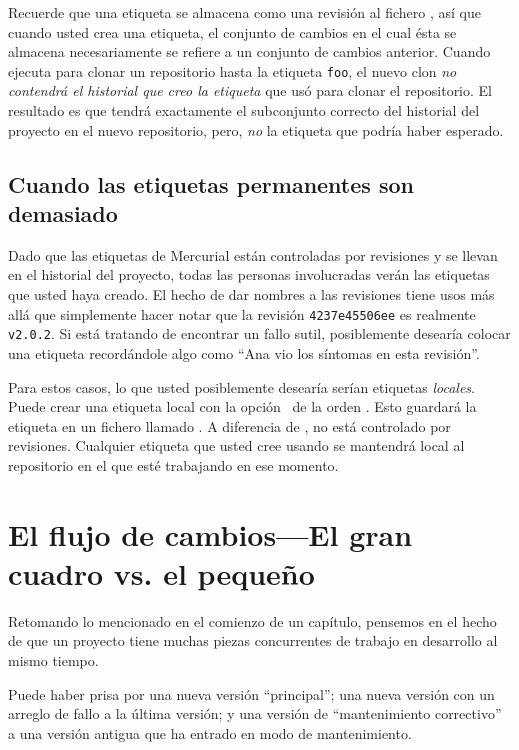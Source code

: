 Recuerde que una etiqueta se almacena como una revisión al fichero
, así que cuando usted crea una etiqueta, el
conjunto de cambios en el cual ésta se almacena necesariamente se
refiere a un conjunto de cambios anterior. Cuando ejecuta
 para clonar un repositorio hasta la etiqueta
\texttt{foo}, el nuevo clon \emph{no contendrá el historial que creo
la etiqueta} que usó para clonar el repositorio. El resultado es que tendrá
exactamente el subconjunto correcto del historial del proyecto en el
nuevo repositorio, pero, \emph{no} la etiqueta que podría haber esperado.

\subsection{Cuando las etiquetas permanentes son demasiado}

Dado que las etiquetas de Mercurial están controladas por revisiones y se
llevan en el historial del proyecto, todas las personas involucradas
verán las etiquetas que usted haya creado. El hecho de dar nombres a las
revisiones tiene usos más allá que simplemente hacer notar que la
revisión \texttt{4237e45506ee} es realmente \texttt{v2.0.2}.  Si está
tratando de encontrar un fallo sutil, posiblemente desearía colocar una 
etiqueta recordándole algo como ``Ana vio los síntomas en esta revisión''.

Para estos casos, lo que usted posiblemente desearía serían etiquetas
\emph{locales}. Puede crear una etiqueta local con la opción~
de la orden .  Esto guardará la etiqueta en un fichero llamado
.  A diferencia de ,
 no está controlado por revisiones.
Cualquier etiqueta que usted cree usando  se mantendrá
local al repositorio en el que esté trabajando en ese momento.

\section{El flujo de cambios---El gran cuadro vs. el pequeño}

Retomando lo mencionado en el comienzo de un capítulo, pensemos en el
hecho de que un proyecto tiene muchas piezas concurrentes de trabajo
en desarrollo al mismo tiempo.

Puede haber prisa por una nueva versión ``principal''; una nueva
versión con un arreglo de fallo a la última versión; y una versión de
``mantenimiento correctivo'' a una versión antigua que ha entrado en
modo de mantenimiento.

